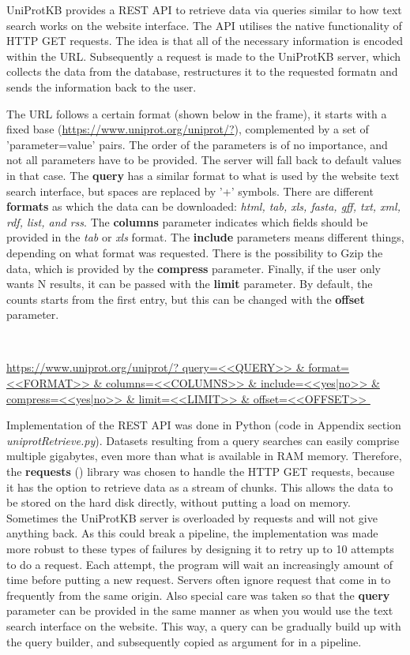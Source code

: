 UniProtKB provides a REST API to retrieve data via queries similar to how text search works on the website interface.
The API utilises the native functionality of HTTP GET requests.
The idea is that all of the necessary information is encoded within the URL.
Subsequently a request is made to the UniProtKB server, 
which collects the data from the database, 
restructures it to the requested formatn
and sends the information back to the user.

The URL follows a certain format (shown below in the frame),
it starts with a fixed base 
(\url{https://www.uniprot.org/uniprot/?}), 
complemented  by a set of 'parameter=value' pairs.
The order of the parameters is of no importance,
and not all parameters have to be provided.
The server will fall back to default values in that case.
The \textbf{query} has a similar format to what is used by the website text search interface,
but spaces are replaced by '+' symbols.
There are different  \textbf{formats} as which the data can be downloaded:
\textit{
html,
tab,
xls, 
fasta,
gff,
txt,
xml,
rdf,
list,
and rss}.
The \textbf{columns} parameter indicates which fields should be provided in the \textit{tab} or \textit{xls} format.
The \textbf{include} parameters means different things, depending on what format was requested.
There is the possibility to Gzip the data, which is provided by the \textbf{compress} parameter.
Finally, if the user only wants N results,
it can be passed with the \textbf{limit} parameter.
By default, the counts starts from the first entry, 
but this can be changed with the \textbf{offset} parameter.


~\begin{tcolorbox}
	\url{
	https://www.uniprot.org/uniprot/?
	query=<<QUERY>>
	&
	format=<<FORMAT>>
	&
	columns=<<COLUMNS>>
	&
	include=<<yes|no>>
	&
	compress=<<yes|no>>
	&
	limit=<<LIMIT>>
	& 
	offset=<<OFFSET>>
	}
 ~\end{tcolorbox}

Implementation of the REST API was done in Python (code in Appendix section \textit{uniprotRetrieve.py}).
Datasets resulting from a query searches can easily comprise multiple gigabytes,
even more than what is available in RAM memory.
Therefore, the \textbf{requests} (\cite{reitz2012}) library was chosen to handle the HTTP GET requests,
because it has the option to retrieve data as a stream of chunks.
This allows the data to be stored on the hard disk directly, without putting a load on memory.
Sometimes the UniProtKB server is overloaded by requests and will not give anything back.
As this could break a pipeline,
the implementation was made more robust to these types of failures by
designing it to retry up to 10 attempts to do a request.
Each attempt, the program will wait an increasingly amount of time before putting a new request. 
Servers often ignore request that come in to frequently from the same origin.
Also special care was taken so that the \textbf{query} parameter can be provided in the same manner as when you would use the text search interface on the website. 
This way, a query can be gradually build up with the query builder, 
and subsequently copied as argument for in a pipeline.

